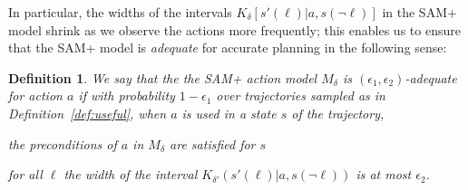 \documentclass[letterpaper]{article} %
\newtheorem{definition}{Definition}
\begin{document}
In particular, the widths of the intervals $K_\delta[s'(\ell)|a,s(\neg\ell)]$ in the SAM+ model shrink as we observe the actions more frequently; this enables us to ensure that the SAM+ model is \emph{adequate} for accurate planning in the following sense:

\begin{definition}
We say that the the SAM+ action model $M_\delta$ is \emph{$(\epsilon_1,\epsilon_2)$-adequate} for action $a$ if with probability $1-\epsilon_1$ over trajectories sampled as in Definition~\ref{def:useful}, when $a$ is used in a state $s$ of the trajectory,
\begin{compactenum}
\item the preconditions of $a$ in $M_\delta$ are satisfied for $s$
\item for all $\ell$ the width of the interval $K_{\delta'}(s'(\ell)|a,s(\neg\ell))$ is at most $\epsilon_2$.
\end{compactenum}
\end{definition}
\end{document}
